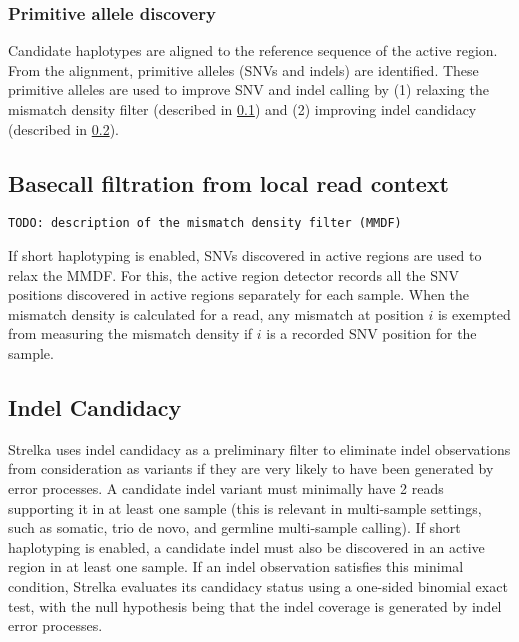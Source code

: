\documentclass{article}
\begin{document}
\subsubsection{Primitive allele discovery}
Candidate haplotypes are aligned to the reference sequence of the active region. From the alignment, primitive alleles (SNVs and indels) are identified. These primitive alleles are used to improve SNV and indel calling by (1) relaxing the mismatch density filter (described in \ref{sec:BasecallFiltrationFromContext}) and (2) improving indel candidacy (described in \ref{sec:IndelCandidacy}).

\subsection{Basecall filtration from local read context}
\label{sec:BasecallFiltrationFromContext}

{\tt TODO: description of the mismatch density filter (MMDF)}

If short haplotyping is enabled, SNVs discovered in active regions are used to relax the MMDF. For this, the active region detector records all the SNV positions discovered in active regions separately for each sample. When the mismatch density is calculated for a read, any mismatch at position $i$ is exempted from measuring the mismatch density if $i$ is a recorded SNV position for the sample.


\subsection{Indel Candidacy}
\label{sec:IndelCandidacy}

Strelka uses indel candidacy as a preliminary filter to eliminate indel observations from consideration as variants if they are very likely to have been generated by error processes.  A candidate indel variant must minimally have 2 reads supporting it in at least one sample (this is relevant in multi-sample settings, such as somatic, trio de novo, and germline multi-sample calling). If short haplotyping is enabled, a candidate indel must also be discovered in an active region in at least one sample. If an indel observation satisfies this minimal condition, Strelka evaluates its candidacy status using a one-sided binomial exact test, with the null hypothesis being that the indel coverage is generated by indel error processes.
\end{document}
